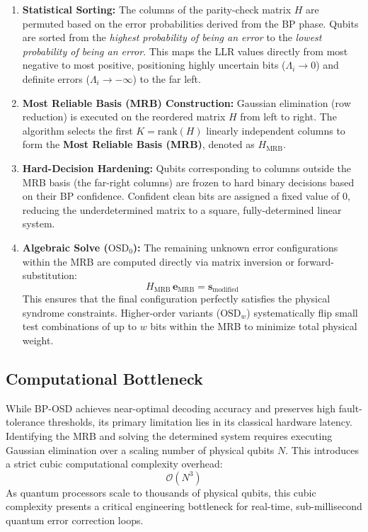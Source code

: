 \begin{enumerate}
    \item \textbf{Statistical Sorting:} The columns of the parity-check matrix $H$ are permuted based on the error probabilities derived from the BP phase. Qubits are sorted from the \textit{highest probability of being an error} to the \textit{lowest probability of being an error}. This maps the LLR values directly from most negative to most positive, positioning highly uncertain bits ($\Lambda_i \to 0$) and definite errors ($\Lambda_i \to -\infty$) to the far left.
    
    \item \textbf{Most Reliable Basis (MRB) Construction:} Gaussian elimination (row reduction) is executed on the reordered matrix $H$ from left to right. The algorithm selects the first $K = \text{rank}(H)$ linearly independent columns to form the \textbf{Most Reliable Basis (MRB)}, denoted as $H_{\text{MRB}}$.
    
    \item \textbf{Hard-Decision Hardening:} Qubits corresponding to columns outside the MRB basis (the far-right columns) are frozen to hard binary decisions based on their BP confidence. Confident clean bits are assigned a fixed value of $0$, reducing the underdetermined matrix to a square, fully-determined linear system.
    
    \item \textbf{Algebraic Solve ($\text{OSD}_0$):} The remaining unknown error configurations within the MRB are computed directly via matrix inversion or forward-substitution:
    \begin{equation}
        H_{\text{MRB}} \, \mathbf{e}_{\text{MRB}} = \mathbf{s}_{\text{modified}}
    \end{equation}
    This ensures that the final configuration perfectly satisfies the physical syndrome constraints. Higher-order variants ($\text{OSD}_w$) systematically flip small test combinations of up to $w$ bits within the MRB to minimize total physical weight.
\end{enumerate}

\subsection{Computational Bottleneck}
While BP-OSD achieves near-optimal decoding accuracy and preserves high fault-tolerance thresholds, its primary limitation lies in its classical hardware latency. Identifying the MRB and solving the determined system requires executing Gaussian elimination over a scaling number of physical qubits $N$. This introduces a strict cubic computational complexity overhead:
\begin{equation}
    \mathcal{O}(N^3)
\end{equation}
As quantum processors scale to thousands of physical qubits, this cubic complexity presents a critical engineering bottleneck for real-time, sub-millisecond quantum error correction loops.



